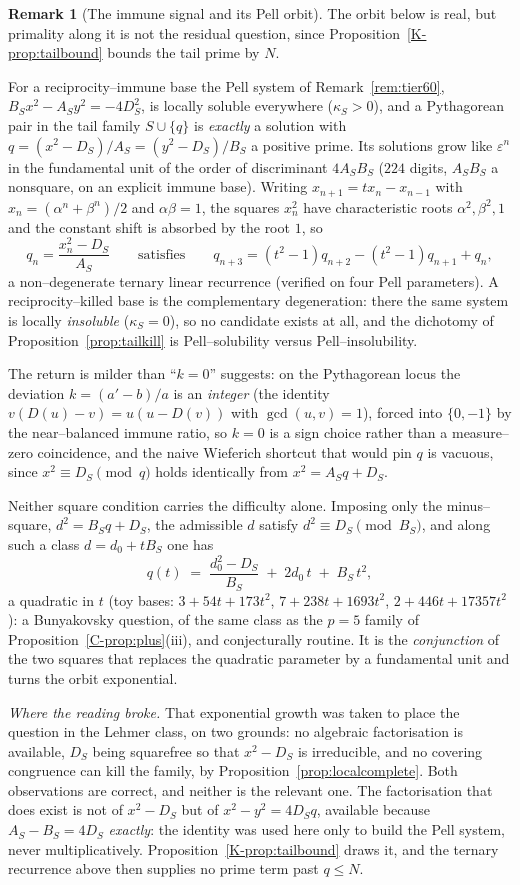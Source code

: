 \documentclass[11pt]{article}
\theoremstyle{definition}
\newtheorem{remark}[theorem]{Remark}
\begin{document}
\begin{remark}[The immune signal and its Pell orbit]\label{rem:lehmer}
The orbit below is real, but primality along it is not the residual question, since
Proposition~\ref{K-prop:tailbound} bounds the tail prime by $N$.

For a reciprocity--immune base the Pell system of Remark~\ref{rem:tier60},
$B_Sx^2-A_Sy^2=-4D_S^2$, is locally soluble everywhere ($\kappa_S>0$), and a Pythagorean pair in the
tail family $S\cup\{q\}$ is \emph{exactly} a solution with $q=(x^2-D_S)/A_S=(y^2-D_S)/B_S$ a
positive prime. Its solutions grow like $\varepsilon^n$ in the fundamental unit of the order of
discriminant $4A_SB_S$ ($224$ digits, $A_SB_S$ a nonsquare, on an explicit immune base). Writing
$x_{n+1}=tx_n-x_{n-1}$ with $x_n=(\alpha^n+\beta^n)/2$ and $\alpha\beta=1$, the squares $x_n^2$ have
characteristic roots $\alpha^2,\beta^2,1$ and the constant shift is absorbed by the root $1$, so
\[ q_n=\frac{x_n^2-D_S}{A_S}\qquad\text{satisfies}\qquad q_{n+3}=(t^2-1)q_{n+2}-(t^2-1)q_{n+1}+q_n, \]
a non--degenerate ternary linear recurrence (verified on four Pell parameters). A
reciprocity--killed base is the complementary degeneration: there the same system is locally
\emph{insoluble} ($\kappa_S=0$), so no candidate exists at all, and the dichotomy of
Proposition~\ref{prop:tailkill} is Pell--solubility versus Pell--insolubility.

The return is milder than ``$k=0$'' suggests: on the Pythagorean locus the deviation $k=(a'-b)/a$ is
an \emph{integer} (the identity $v(D(u)-v)=u(u-D(v))$ with $\gcd(u,v)=1$), forced into $\{0,-1\}$ by
the near--balanced immune ratio, so $k=0$ is a sign choice rather than a measure--zero coincidence,
and the naive Wieferich shortcut that would pin $q$ is vacuous, since $x^2\equiv D_S\pmod q$ holds
identically from $x^2=A_Sq+D_S$.

Neither square condition carries the difficulty alone. Imposing only the minus--square,
$d^2=B_Sq+D_S$, the admissible $d$ satisfy $d^2\equiv D_S\pmod{B_S}$, and along such a class
$d=d_0+tB_S$ one has
\[ q(t)\;=\;\frac{d_0^2-D_S}{B_S}\;+\;2d_0\,t\;+\;B_S\,t^2, \]
a quadratic in $t$ (toy bases: $3+54t+173t^2$, $7+238t+1693t^2$, $2+446t+17357t^2$): a Bunyakovsky
question, of the same class as the $p=5$ family of Proposition~\ref{C-prop:plus}\textup{(iii)}, and
conjecturally routine. It is the \emph{conjunction} of the two squares that replaces the quadratic
parameter by a fundamental unit and turns the orbit exponential.

\emph{Where the reading broke.} That exponential growth was taken to place the question in the
Lehmer class, on two grounds: no algebraic factorisation is available, $D_S$ being squarefree so
that $x^2-D_S$ is irreducible, and no covering congruence can kill the family, by
Proposition~\ref{prop:localcomplete}. Both observations are correct, and neither is the relevant
one. The factorisation that does exist is not of $x^2-D_S$ but of $x^2-y^2=4D_Sq$, available because
$A_S-B_S=4D_S$ \emph{exactly}: the identity was used here only to build the Pell system, never
multiplicatively. Proposition~\ref{K-prop:tailbound} draws it, and the ternary recurrence above then
supplies no prime term past $q\le N$.


\end{remark}
\end{document}
